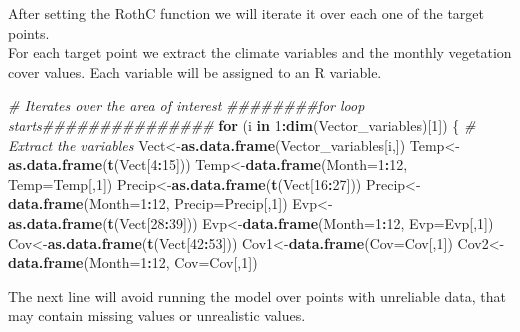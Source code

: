 \documentclass[
  10pt,
  b5paper,
]{book}
\newenvironment{Shaded}{\begin{snugshade}}{\end{snugshade}}
\newcommand{\CommentTok}[1]{\textcolor[rgb]{0.56,0.35,0.01}{\textit{#1}}}
\newcommand{\ControlFlowTok}[1]{\textcolor[rgb]{0.13,0.29,0.53}{\textbf{#1}}}
\newcommand{\DataTypeTok}[1]{\textcolor[rgb]{0.13,0.29,0.53}{#1}}
\newcommand{\DecValTok}[1]{\textcolor[rgb]{0.00,0.00,0.81}{#1}}
\newcommand{\KeywordTok}[1]{\textcolor[rgb]{0.13,0.29,0.53}{\textbf{#1}}}
\newcommand{\NormalTok}[1]{#1}
\newcommand{\OperatorTok}[1]{\textcolor[rgb]{0.81,0.36,0.00}{\textbf{#1}}}
\begin{document}
After setting the RothC function we will iterate it over each one of the target points.\\
For each target point we extract the climate variables and the monthly vegetation cover values. Each variable will be assigned to an R variable.

\begin{Shaded}
\begin{Highlighting}[]
\CommentTok{# Iterates over the area of interest}
\CommentTok{########for loop starts###############}
\ControlFlowTok{for}\NormalTok{ (i }\ControlFlowTok{in} \DecValTok{1}\OperatorTok{:}\KeywordTok{dim}\NormalTok{(Vector_variables)[}\DecValTok{1}\NormalTok{]) \{}
\CommentTok{# Extract the variables }
\NormalTok{Vect<-}\KeywordTok{as.data.frame}\NormalTok{(Vector_variables[i,])}
\NormalTok{Temp<-}\KeywordTok{as.data.frame}\NormalTok{(}\KeywordTok{t}\NormalTok{(Vect[}\DecValTok{4}\OperatorTok{:}\DecValTok{15}\NormalTok{]))}
\NormalTok{Temp<-}\KeywordTok{data.frame}\NormalTok{(}\DataTypeTok{Month=}\DecValTok{1}\OperatorTok{:}\DecValTok{12}\NormalTok{, }\DataTypeTok{Temp=}\NormalTok{Temp[,}\DecValTok{1}\NormalTok{])}
\NormalTok{Precip<-}\KeywordTok{as.data.frame}\NormalTok{(}\KeywordTok{t}\NormalTok{(Vect[}\DecValTok{16}\OperatorTok{:}\DecValTok{27}\NormalTok{]))}
\NormalTok{Precip<-}\KeywordTok{data.frame}\NormalTok{(}\DataTypeTok{Month=}\DecValTok{1}\OperatorTok{:}\DecValTok{12}\NormalTok{, }\DataTypeTok{Precip=}\NormalTok{Precip[,}\DecValTok{1}\NormalTok{])}
\NormalTok{Evp<-}\KeywordTok{as.data.frame}\NormalTok{(}\KeywordTok{t}\NormalTok{(Vect[}\DecValTok{28}\OperatorTok{:}\DecValTok{39}\NormalTok{]))}
\NormalTok{Evp<-}\KeywordTok{data.frame}\NormalTok{(}\DataTypeTok{Month=}\DecValTok{1}\OperatorTok{:}\DecValTok{12}\NormalTok{, }\DataTypeTok{Evp=}\NormalTok{Evp[,}\DecValTok{1}\NormalTok{])}
\NormalTok{Cov<-}\KeywordTok{as.data.frame}\NormalTok{(}\KeywordTok{t}\NormalTok{(Vect[}\DecValTok{42}\OperatorTok{:}\DecValTok{53}\NormalTok{]))}
\NormalTok{Cov1<-}\KeywordTok{data.frame}\NormalTok{(}\DataTypeTok{Cov=}\NormalTok{Cov[,}\DecValTok{1}\NormalTok{])}
\NormalTok{Cov2<-}\KeywordTok{data.frame}\NormalTok{(}\DataTypeTok{Month=}\DecValTok{1}\OperatorTok{:}\DecValTok{12}\NormalTok{, }\DataTypeTok{Cov=}\NormalTok{Cov[,}\DecValTok{1}\NormalTok{])}
\end{Highlighting}
\end{Shaded}

The next line will avoid running the model over points with unreliable data, that may contain missing values or unrealistic values.
\end{document}
